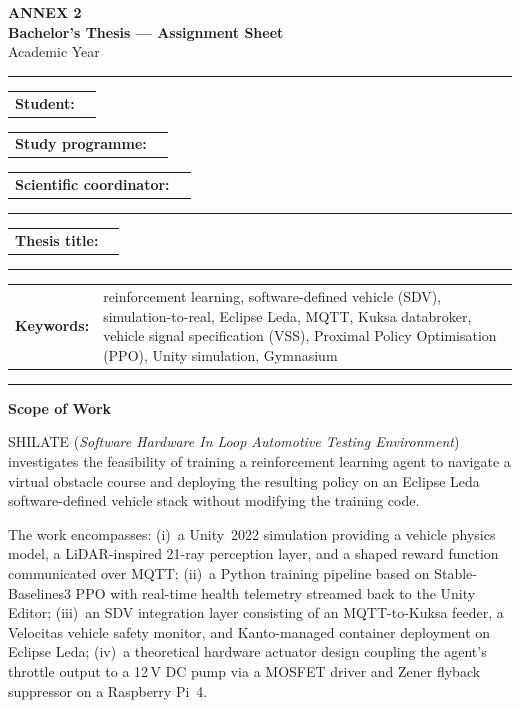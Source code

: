 \documentclass[12pt, a4paper]{article}
\makeatletter
\newcommand{\row}[2]{%
  \noindent\begin{tabular}{@{}p{5.5cm} p{10cm}@{}}
    \textbf{#1} & #2
  \end{tabular}\par\medskip
}
\makeatother
\begin{document}
\thispagestyle{fancy}

\begin{center}
  {\LARGE\bfseries ANNEX 2}\\[6pt]
  {\large\bfseries Bachelor's Thesis --- Assignment Sheet}\\[2pt]
  {\large Academic Year \academicYear}
\end{center}

\vspace{6pt}
\noindent\rule{\textwidth}{0.8pt}
\vspace{4pt}

\row{Student:}{\candidateName}
\row{Study programme:}{\studyProgram}
\row{Scientific coordinator:}{\coordinator}

\vspace{4pt}
\noindent\rule{\textwidth}{0.4pt}
\vspace{4pt}

\row{Thesis title:}{\textbf{\thesisTitle}}

\vspace{4pt}
\noindent\rule{\textwidth}{0.4pt}
\vspace{4pt}

\row{Keywords:}{%
  reinforcement learning,
  software-defined vehicle (SDV),
  simulation-to-real,
  Eclipse Leda,
  MQTT,
  Kuksa databroker,
  vehicle signal specification (VSS),
  Proximal Policy Optimisation (PPO),
  Unity simulation,
  Gymnasium
}

\vspace{4pt}
\noindent\rule{\textwidth}{0.4pt}
\vspace{4pt}

\noindent\textbf{Scope of Work}\par\smallskip
\noindent
SHILATE (\textit{Software Hardware In Loop Automotive Testing Environment})
investigates the feasibility of training a reinforcement learning agent to
navigate a virtual obstacle course and deploying the resulting policy on an
Eclipse Leda software-defined vehicle stack without modifying the training
code.

The work encompasses:
(i)~a Unity~2022 simulation providing a vehicle physics model, a
LiDAR-inspired 21-ray perception layer, and a shaped reward function
communicated over MQTT;
(ii)~a Python training pipeline based on Stable-Baselines3 PPO with
real-time health telemetry streamed back to the Unity Editor;
(iii)~an SDV integration layer consisting of an MQTT-to-Kuksa feeder, a
Velocitas vehicle safety monitor, and Kanto-managed container deployment
on Eclipse Leda;
(iv)~a theoretical hardware actuator design coupling the agent's throttle
output to a 12\,V DC pump via a MOSFET driver and Zener flyback suppressor
on a Raspberry Pi~4.
\end{document}
